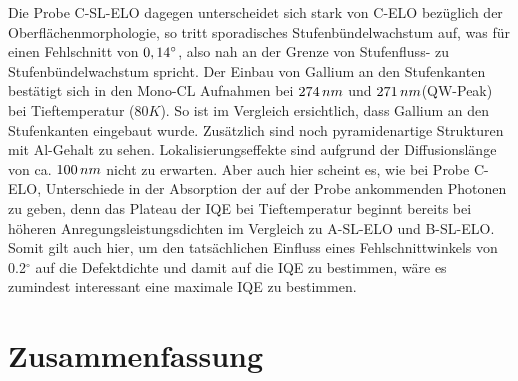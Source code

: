 Die Probe C-SL-ELO dagegen unterscheidet sich stark von C-ELO bezüglich der Oberflächenmorphologie, so tritt sporadisches Stufenbündelwachstum auf, was für einen Fehlschnitt von $0,14 \degree$, also nah an der Grenze von Stufenfluss- zu Stufenbündelwachstum spricht. Der Einbau von Gallium an den Stufenkanten bestätigt sich in den Mono-CL Aufnahmen bei $274 \thinspace nm$ und $271 \thinspace nm$(QW-Peak) bei Tieftemperatur ($80K$). So ist im Vergleich ersichtlich, dass Gallium an den Stufenkanten eingebaut wurde. Zusätzlich sind noch pyramidenartige Strukturen mit Al-Gehalt zu sehen. Lokalisierungseffekte sind aufgrund der Diffusionslänge von ca. $100 \thinspace nm$ nicht zu erwarten. Aber auch hier scheint es, wie bei Probe C-ELO, Unterschiede in der Absorption der auf der Probe ankommenden Photonen zu geben, denn das Plateau der IQE bei Tieftemperatur beginnt bereits bei höheren Anregungsleistungsdichten im Vergleich zu A-SL-ELO und B-SL-ELO. Somit gilt auch hier, um den tatsächlichen Einfluss eines Fehlschnittwinkels von 0.2$^\circ$ auf die Defektdichte und damit auf die IQE zu bestimmen, wäre es zumindest interessant eine maximale IQE zu bestimmen. 


\section{Zusammenfassung}

